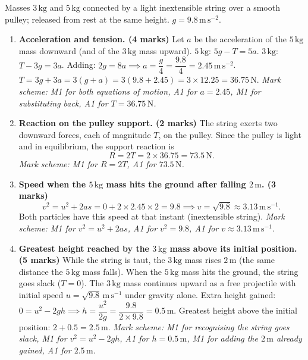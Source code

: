 \documentclass[11pt]{article}
\begin{document}
\begin{corrige}
Masses $3\,\mathrm{kg}$ and $5\,\mathrm{kg}$ connected by a light inextensible string over a smooth pulley; released from rest at the same height. $g = 9.8\,\mathrm{m\,s^{-2}}$.
\begin{enumerate}
\item[(a)] \textbf{Acceleration and tension. (4 marks)}
Let $a$ be the acceleration of the $5\,\mathrm{kg}$ mass downward (and of the $3\,\mathrm{kg}$ mass upward).
$5\,\mathrm{kg}$: $5g - T = 5a$.
$3\,\mathrm{kg}$: $T - 3g = 3a$.
Adding: $2g = 8a \implies a = \dfrac{g}{4} = \dfrac{9.8}{4} = 2.45\,\mathrm{m\,s^{-2}}$.
$T = 3g + 3a = 3(g+a) = 3(9.8+2.45) = 3\times 12.25 = 36.75\,\mathrm{N}$.
\textit{Mark scheme: M1 for both equations of motion, A1 for $a = 2.45$, M1 for substituting back, A1 for $T = 36.75\,\mathrm{N}$.}
\item[(b)] \textbf{Reaction on the pulley support. (2 marks)}
The string exerts two downward forces, each of magnitude $T$, on the pulley. Since the pulley is light and in equilibrium, the support reaction is
\[R = 2T = 2\times 36.75 = 73.5\,\mathrm{N}.\]
\textit{Mark scheme: M1 for $R = 2T$, A1 for $73.5\,\mathrm{N}$.}
\item[(c)] \textbf{Speed when the $5\,\mathrm{kg}$ mass hits the ground after falling $2\,\mathrm{m}$. (3 marks)}
\[v^2 = u^2 + 2as = 0 + 2\times 2.45\times 2 = 9.8 \implies v = \sqrt{9.8} \approx 3.13\,\mathrm{m\,s^{-1}}.\]
Both particles have this speed at that instant (inextensible string).
\textit{Mark scheme: M1 for $v^2 = u^2 + 2as$, A1 for $v^2 = 9.8$, A1 for $v \approx 3.13\,\mathrm{m\,s^{-1}}$.}
\item[(d)] \textbf{Greatest height reached by the $3\,\mathrm{kg}$ mass above its initial position. (5 marks)}
While the string is taut, the $3\,\mathrm{kg}$ mass rises $2\,\mathrm{m}$ (the same distance the $5\,\mathrm{kg}$ mass falls).
When the $5\,\mathrm{kg}$ mass hits the ground, the string goes slack ($T = 0$). The $3\,\mathrm{kg}$ mass continues upward as a free projectile with initial speed $u = \sqrt{9.8}\,\mathrm{m\,s^{-1}}$ under gravity alone.
Extra height gained: $0 = u^2 - 2gh \implies h = \dfrac{u^2}{2g} = \dfrac{9.8}{2\times 9.8} = 0.5\,\mathrm{m}$.
Greatest height above the initial position: $2 + 0.5 = 2.5\,\mathrm{m}$.
\textit{Mark scheme: M1 for recognising the string goes slack, M1 for $v^2 = u^2 - 2gh$, A1 for $h = 0.5\,\mathrm{m}$, M1 for adding the $2\,\mathrm{m}$ already gained, A1 for $2.5\,\mathrm{m}$.}
\end{enumerate}
\end{corrige}
\end{document}
